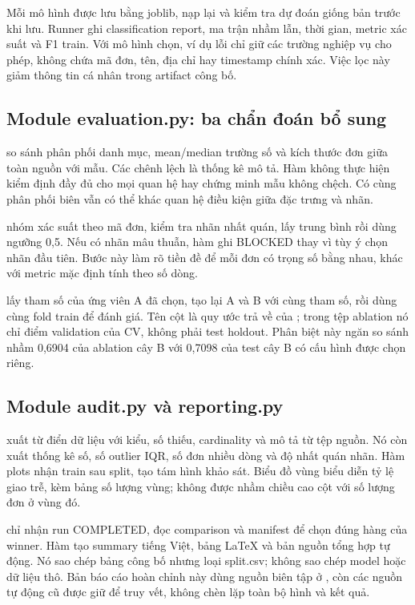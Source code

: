 Mỗi mô hình được lưu bằng joblib, nạp lại và kiểm tra dự đoán giống bản
trước khi lưu. Runner ghi classification report, ma trận nhầm lẫn, thời
gian, metric xác suất và F1 train. Với mô hình chọn, ví dụ lỗi chỉ giữ các
trường nghiệp vụ cho phép, không chứa mã đơn, tên, địa chỉ hay timestamp
chính xác. Việc lọc này giảm thông tin cá nhân trong artifact công bố.

\subsection{Module evaluation.py: ba chẩn đoán bổ sung}
 so sánh phân phối danh mục, mean/median trường
số và kích thước đơn giữa toàn nguồn với mẫu. Các chênh lệch là thống kê
mô tả. Hàm không thực hiện kiểm định đầy đủ cho mọi quan hệ hay chứng minh
mẫu không chệch. Có cùng phân phối biên vẫn có thể khác quan hệ điều kiện
giữa đặc trưng và nhãn.

 nhóm xác suất theo mã đơn, kiểm tra nhãn nhất quán,
lấy trung bình rồi dùng ngưỡng 0,5. Nếu có nhãn mâu thuẫn, hàm ghi BLOCKED
thay vì tùy ý chọn nhãn đầu tiên. Bước này làm rõ tiền đề để mỗi đơn có
trọng số bằng nhau, khác với metric mặc định tính theo số dòng.

 lấy tham số của ứng viên A đã chọn, tạo lại A và B
với cùng tham số, rồi dùng cùng fold train để đánh giá. Tên cột
 là quy ước trả về của ; trong tệp
ablation nó chỉ điểm validation của CV, không phải test holdout.
Phân biệt này ngăn so sánh nhầm 0,6904 của ablation cây B với 0,7098 của
test cây B có cấu hình được chọn riêng.

\subsection{Module audit.py và reporting.py}
 xuất từ điển dữ liệu với kiểu, số thiếu, cardinality và mô
tả từ tệp nguồn. Nó còn xuất thống kê số, số outlier IQR, số đơn nhiều dòng
và độ nhất quán nhãn. Hàm plots nhận train sau split, tạo tám hình khảo
sát. Biểu đồ vùng biểu diễn tỷ lệ giao trễ, kèm bảng số lượng vùng; không
được nhầm chiều cao cột với số lượng đơn ở vùng đó.

 chỉ nhận run COMPLETED, đọc comparison và manifest để
chọn đúng hàng của winner. Hàm tạo summary tiếng Việt, bảng LaTeX và bản
nguồn tổng hợp tự động. Nó sao chép bảng công bố nhưng loại split.csv;
không sao chép model hoặc dữ liệu thô. Bản báo cáo hoàn chỉnh này dùng
nguồn biên tập ở , còn các nguồn tự động cũ được
giữ để truy vết, không chèn lặp toàn bộ hình và kết quả.

